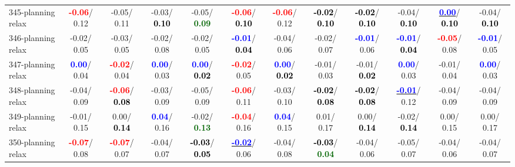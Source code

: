 \begin{table}[h]
\begin{center}
{\begin{tabular}{lc|c|c|c|c|c|c|c|c|c|c}
345-planning relax & \textcolor{red}{\textbf{ -0.06}}/  0.12 &  -0.05/  0.11 &  -0.03/\textcolor{black}{\textbf{  0.10}} &  -0.05/\textcolor{darkgreen}{\textbf{  0.09}} & \textcolor{red}{\textbf{ -0.06}}/\textcolor{black}{\textbf{  0.10}} & \textcolor{red}{\textbf{ -0.06}}/  0.12 & \textcolor{black}{\textbf{ -0.02}}/\textcolor{black}{\textbf{  0.10}} & \textcolor{black}{\textbf{ -0.02}}/\textcolor{black}{\textbf{  0.10}} &  -0.04/\textcolor{black}{\textbf{  0.10}} & \underline{\textcolor{blue}{\textbf{  0.00}}}/\textcolor{black}{\textbf{  0.10}} &  -0.04/\textcolor{black}{\textbf{  0.10}} \\
346-planning relax &  -0.02/  0.05 &  -0.03/  0.05 &  -0.02/  0.08 &  -0.02/  0.05 & \textcolor{blue}{\textbf{ -0.01}}/\textcolor{black}{\textbf{  0.04}} &  -0.04/  0.06 &  -0.02/  0.07 & \textcolor{blue}{\textbf{ -0.01}}/  0.06 & \textcolor{blue}{\textbf{ -0.01}}/\textcolor{black}{\textbf{  0.04}} & \textcolor{red}{\textbf{ -0.05}}/  0.08 & \textcolor{blue}{\textbf{ -0.01}}/  0.05 \\
347-planning relax & \textcolor{blue}{\textbf{  0.00}}/  0.04 & \textcolor{red}{\textbf{ -0.02}}/  0.04 & \textcolor{blue}{\textbf{  0.00}}/  0.03 & \textcolor{blue}{\textbf{  0.00}}/\textcolor{black}{\textbf{  0.02}} & \textcolor{red}{\textbf{ -0.02}}/  0.05 & \textcolor{blue}{\textbf{  0.00}}/\textcolor{black}{\textbf{  0.02}} &  -0.01/  0.03 &  -0.01/\textcolor{black}{\textbf{  0.02}} & \textcolor{blue}{\textbf{  0.00}}/  0.03 &  -0.01/  0.04 & \textcolor{blue}{\textbf{  0.00}}/  0.03 \\
348-planning relax &  -0.04/  0.09 & \textcolor{red}{\textbf{ -0.06}}/\textcolor{black}{\textbf{  0.08}} &  -0.03/  0.09 &  -0.05/  0.09 & \textcolor{red}{\textbf{ -0.06}}/  0.11 &  -0.03/  0.10 & \textcolor{black}{\textbf{ -0.02}}/\textcolor{black}{\textbf{  0.08}} & \textcolor{black}{\textbf{ -0.02}}/\textcolor{black}{\textbf{  0.08}} & \underline{\textcolor{blue}{\textbf{ -0.01}}}/  0.12 &  -0.04/  0.09 &  -0.04/  0.09 \\ \hline
349-planning relax &  -0.01/  0.15 &   0.00/\textcolor{black}{\textbf{  0.14}} & \textcolor{blue}{\textbf{  0.04}}/  0.16 &  -0.02/\textcolor{darkgreen}{\textbf{  0.13}} & \textcolor{red}{\textbf{ -0.04}}/  0.16 & \textcolor{blue}{\textbf{  0.04}}/  0.15 &   0.01/  0.17 &   0.00/\textcolor{black}{\textbf{  0.14}} &  -0.02/\textcolor{black}{\textbf{  0.14}} &   0.00/  0.15 &   0.00/  0.17 \\
350-planning relax & \textcolor{red}{\textbf{ -0.07}}/  0.08 & \textcolor{red}{\textbf{ -0.07}}/  0.07 &  -0.04/  0.07 & \textcolor{black}{\textbf{ -0.03}}/\textcolor{black}{\textbf{  0.05}} & \underline{\textcolor{blue}{\textbf{ -0.02}}}/  0.06 &  -0.04/  0.08 & \textcolor{black}{\textbf{ -0.03}}/\textcolor{darkgreen}{\textbf{  0.04}} &  -0.04/  0.06 &  -0.05/  0.07 &  -0.04/  0.06 &  -0.04/  0.07 \\

\end{tabular}}
\end{center}
\end{table}
